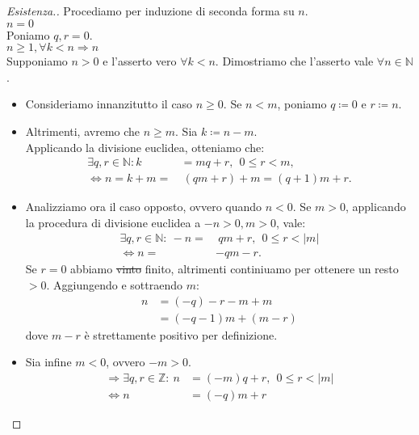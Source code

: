 \documentclass[12pt]{article}
\newcommand{\N}{\mathbb{N}}
\newcommand{\Z}{\mathbb{Z}}
\newcommand{\sesolose}{\Leftrightarrow}
\newcommand{\implica}{\Longrightarrow}
\newcommand{\nin}{\forall n\in\N}
\renewcommand\qedsymbol{$\blacksquare$}
\newcommand{\baseinduz}[1]{\\[1\baselineskip]{\boldmath$n = #1$}}
\newcommand{\induzdue}[1]{\\[1\baselineskip]{\boldmath$n \ge #1, \forall k < n \implica n$}}
\begin{document}
\renewcommand\qedsymbol{$\square$}
\begin{proof}[Esistenza.]
	Procediamo per induzione di seconda forma su $n$.
	\baseinduz{0}
	\\Poniamo $q, r = 0$.
	\induzdue{1}
	\\Supponiamo $n > 0$ e l'asserto vero $\forall k < n$. Dimostriamo che l'asserto vale $\nin$.
	\begin{itemize}
		\item Consideriamo innanzitutto il caso $n \ge 0$. Se $n < m$, poniamo $q \coloneqq 0$ e $ r \coloneqq n$.
		\item Altrimenti, avremo che $n \ge m$. Sia $k \coloneqq n - m$.\\Applicando la divisione euclidea, otteniamo che:
		\begin{align*}
			\exists q, r \in \N : k & = mq + r, \ \ 0 \le r <m,     \\
			\sesolose n = k + m =   & \ (qm + r) + m = (q+1) m + r.
		\end{align*}
		\item Analizziamo ora il caso opposto, ovvero quando $n < 0$. Se $m > 0$, applicando la procedura di divisione euclidea a $-n > 0, m >0$, vale:
		\begin{align*}
			\exists q, r \in \N:\ -n = & \ qm + r, \ \ 0 \le r < |m| \\
			\sesolose n =              & - qm - r.
		\end{align*}
		Se $ r = 0$ abbiamo \sout{vinto} finito, altrimenti continiuamo per ottenere un resto $> 0$. Aggiungendo e sottraendo $m$:
		\begin{align*}
			n & = (-q)-r-m+m    \\
			& = (-q-1)m+(m-r)
		\end{align*}
		dove $m-r$ è strettamente positivo per definizione.
		\item Sia infine $m < 0$, ovvero $-m > 0$.
		\begin{align*}
			\implica \exists q, r \in \Z:\ n & = (-m)q + r, \ \ 0 \le r < |m| \\
			\sesolose n                      & = (-q)m + r
		\end{align*}
	\end{itemize}
\end{proof}
\renewcommand\qedsymbol{$\blacksquare$}
\end{document}
